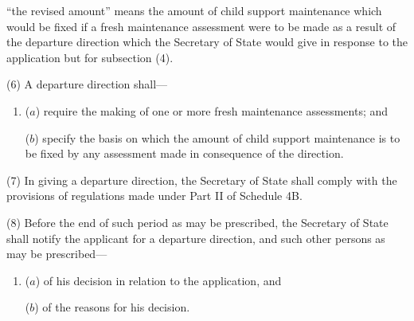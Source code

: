 \documentclass[12pt,a4paper]{article}
\begin{document}
{\begin{enumerate}
“the revised amount” means the amount of child support maintenance which would be fixed if a fresh maintenance assessment were to be made as a result of the departure direction which the Secretary of State would give in response to the application but for subsection (4).
\end{enumerate}

(6) A departure direction shall—
\begin{enumerate}\item[]
($a$) require 
the making of
one or more fresh maintenance assessments; and

($b$) specify the basis on which the amount of child support maintenance is to be fixed by any assessment made in consequence of the direction.
\end{enumerate}

(7) In giving a departure direction, the Secretary of State shall comply with the provisions of regulations made under Part II of Schedule 4B.

(8) Before the end of such period as may be prescribed, the Secretary of State shall notify the applicant for a departure direction, and such other persons as may be prescribed—
\begin{enumerate}\item[]
($a$) of his decision in relation to the application, and

($b$) of the reasons for his decision.
\end{enumerate}

}
\end{document}
